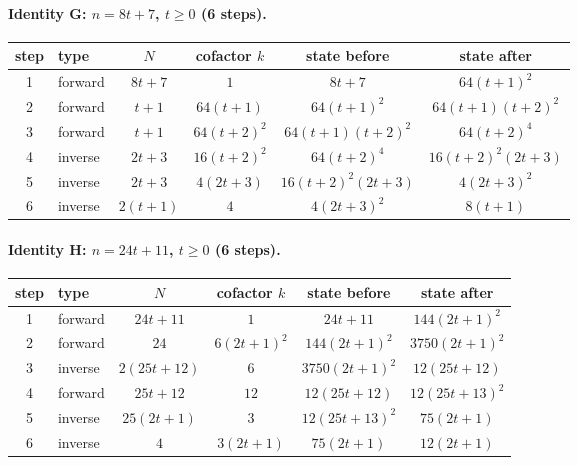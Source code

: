 \paragraph{Identity G: $n=8t+7$, $t\ge 0$ (6 steps).}
\begin{center}\footnotesize
\begin{tabular}{@{}clcccc@{}}\toprule
step & type & $N$ & cofactor $k$ & state before & state after \\ \midrule
1 & forward & $8 t + 7$ & $1$ & $8 t + 7$ & $64 \left(t + 1\right)^{2}$ \\
2 & forward & $t + 1$ & $64 \left(t + 1\right)$ & $64 \left(t + 1\right)^{2}$ & $64 \left(t + 1\right) \left(t + 2\right)^{2}$ \\
3 & forward & $t + 1$ & $64 \left(t + 2\right)^{2}$ & $64 \left(t + 1\right) \left(t + 2\right)^{2}$ & $64 \left(t + 2\right)^{4}$ \\
4 & inverse & $2 t + 3$ & $16 \left(t + 2\right)^{2}$ & $64 \left(t + 2\right)^{4}$ & $16 \left(t + 2\right)^{2} \left(2 t + 3\right)$ \\
5 & inverse & $2 t + 3$ & $4 \left(2 t + 3\right)$ & $16 \left(t + 2\right)^{2} \left(2 t + 3\right)$ & $4 \left(2 t + 3\right)^{2}$ \\
6 & inverse & $2 \left(t + 1\right)$ & $4$ & $4 \left(2 t + 3\right)^{2}$ & $8 \left(t + 1\right)$ \\
\bottomrule\end{tabular}\end{center}
\paragraph{Identity H: $n=24t+11$, $t\ge 0$ (6 steps).}
\begin{center}\footnotesize
\begin{tabular}{@{}clcccc@{}}\toprule
step & type & $N$ & cofactor $k$ & state before & state after \\ \midrule
1 & forward & $24 t + 11$ & $1$ & $24 t + 11$ & $144 \left(2 t + 1\right)^{2}$ \\
2 & forward & $24$ & $6 \left(2 t + 1\right)^{2}$ & $144 \left(2 t + 1\right)^{2}$ & $3750 \left(2 t + 1\right)^{2}$ \\
3 & inverse & $2 \left(25 t + 12\right)$ & $6$ & $3750 \left(2 t + 1\right)^{2}$ & $12 \left(25 t + 12\right)$ \\
4 & forward & $25 t + 12$ & $12$ & $12 \left(25 t + 12\right)$ & $12 \left(25 t + 13\right)^{2}$ \\
5 & inverse & $25 \left(2 t + 1\right)$ & $3$ & $12 \left(25 t + 13\right)^{2}$ & $75 \left(2 t + 1\right)$ \\
6 & inverse & $4$ & $3 \left(2 t + 1\right)$ & $75 \left(2 t + 1\right)$ & $12 \left(2 t + 1\right)$ \\
\bottomrule\end{tabular}\end{center}
